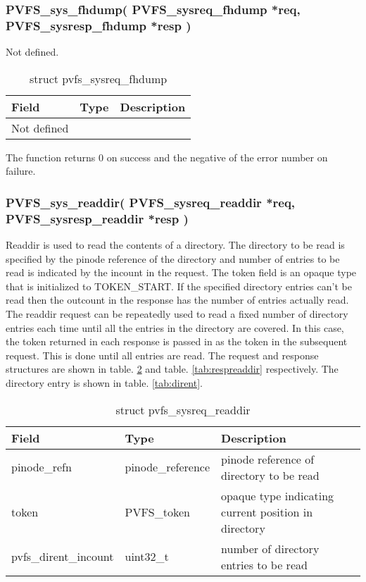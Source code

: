 \documentclass[11pt, letterpaper]{article}
\begin{document}
\subsubsection{PVFS\_sys\_fhdump(
PVFS\_sysreq\_fhdump *req,
PVFS\_sysresp\_fhdump *resp
)}

Not defined.

\begin{table}[H]
\begin{tabular}{|l|l|l|}
\hline
Field & Type & Description \\
\hline
\hline
Not defined & & \\
\hline
\end{tabular}
\caption{struct pvfs\_sysreq\_fhdump}\label{tab:reqfhdump}
\end{table}

The function returns 0 on success and the negative of the error
number on failure.

\subsubsection{PVFS\_sys\_readdir(
PVFS\_sysreq\_readdir *req,
PVFS\_sysresp\_readdir *resp
)}

Readdir is used to read the contents of a directory. The directory
to be read is specified by the pinode reference of the directory
and number of entries to be read is indicated by the incount in the
request. The token field is an opaque type that is initialized to
TOKEN\_START. If the specified directory entries can't be read then
the outcount in the response has the number of entries actually read.
The readdir request can be repeatedly used to read a fixed number of
directory entries each time until all the entries in the directory
are covered. In this case, the token returned in each response is
passed in as the token in the subsequent request. This is done until
all entries are read. The request and response structures are shown 
in table. \ref{tab:reqreaddir} and table. \ref{tab:respreaddir} 
respectively. The directory entry is shown in table. \ref{tab:dirent}.

\begin{table}[H]
\begin{tabular}{|l|l|l|}
\hline
Field & Type & Description \\
\hline
\hline
pinode\_refn & pinode\_reference & pinode reference of directory to be
read \\
\hline
token & PVFS\_token & opaque type indicating current position in directory \\
\hline
pvfs\_dirent\_incount & uint32\_t & number of directory entries to
be read \\
\hline
\hline
\end{tabular}
\caption{struct pvfs\_sysreq\_readdir}\label{tab:reqreaddir}
\end{table}
\end{document}

